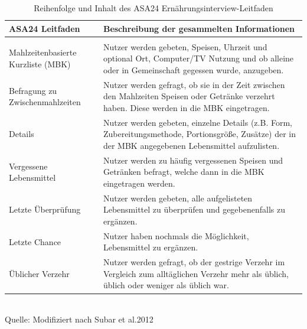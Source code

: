 

\begin{table}[!h]
\begin{flushleft}
\caption{ Reihenfolge und Inhalt des ASA24 Ernährungsinterview-Leitfaden}
\end{flushleft}
\begin{tabular}{l p{8cm}}
ASA24 Leitfaden & Beschreibung der gesammelten Informationen \\
\hline\\

Mahlzeitenbasierte Kurzliste (MBK) &
Nutzer werden gebeten, Speisen, Uhrzeit und optional Ort, Computer/TV Nutzung und ob alleine oder in Gemeinschaft gegessen wurde, anzugeben. \\

Befragung zu Zwischenmahlzeiten &
Nutzer werden gefragt, ob sie in der Zeit zwischen den Mahlzeiten Speisen oder Getränke verzehrt haben.  Diese werden in die MBK eingetragen.\\

Details &
Nutzer werden gebeten, einzelne Details (z.B.  Form, Zubereitungsmethode, Portionsgröße, Zusätze) der in der MBK angegebenen Lebensmittel aufzulisten. \\

Vergessene Lebensmittel &
Nutzer werden zu häufig vergessenen Speisen und Getränken befragt, welche dann in die MBK eingetragen werden.\\

Letzte Überprüfung &
Nutzer werden gebeten, alle aufgelisteten Lebensmittel zu überprüfen und gegebenenfalls zu ergänzen.\\

Letzte Chance &
Nutzer haben nochmals die Möglichkeit, Lebensmittel zu ergänzen.\\

Üblicher Verzehr &
Nutzer werden gefragt, ob der gestrige Verzehr im Vergleich zum alltäglichen Verzehr mehr als üblich, üblich oder weniger als üblich war.\\


\end{tabular}
\\Quelle: Modifiziert nach Subar et al.2012
\end{table}





